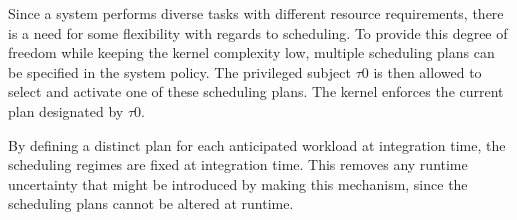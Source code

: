 Since a system performs diverse tasks with different resource requirements,
there is a need for some flexibility with regards to scheduling. To provide this
degree of freedom while keeping the kernel complexity low, multiple scheduling
plans can be specified in the system policy. The privileged subject $\tau$0 is
then allowed to select and activate one of these scheduling plans. The kernel
enforces the current plan designated by $\tau$0.

By defining a distinct plan for each anticipated workload at integration time,
the scheduling regimes are fixed at integration time. This removes any runtime
uncertainty that might be introduced by making this mechanism, since the
scheduling plans cannot be altered at runtime.
